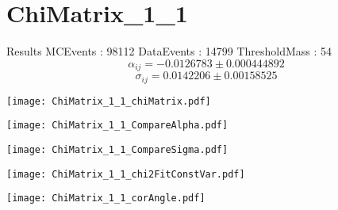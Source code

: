 \documentclass[a4paper,12pt]{article}
\begin{document}
\section{ChiMatrix\_1\_1}
\begin{minipage}{0.49\linewidth} Results \newline
MCEvents : 98112\newline
DataEvents : 14799 \newline
ThresholdMass : 54\\
$$\alpha_{ij} = -0.0126783\pm 0.000444892$$
$$\sigma_{ij} = 0.0142206\pm 0.00158525$$
\end{minipage}\hfill
\begin{minipage}{0.49\linewidth} 
\texttt{[image: ChiMatrix\_1\_1\_chiMatrix.pdf]}\\
\end{minipage}
\hfill
\begin{minipage}{0.49\linewidth} 
\texttt{[image: ChiMatrix\_1\_1\_CompareAlpha.pdf]}\\
\end{minipage}
\hfill
\begin{minipage}{0.49\linewidth} 
\texttt{[image: ChiMatrix\_1\_1\_CompareSigma.pdf]}\\
\end{minipage}
\begin{minipage}{0.49\linewidth} 
\texttt{[image: ChiMatrix\_1\_1\_chi2FitConstVar.pdf]}\\
\end{minipage}
\hfill
\begin{minipage}{0.49\linewidth} 
\texttt{[image: ChiMatrix\_1\_1\_corAngle.pdf]}\\
\end{minipage}
\end{document}
